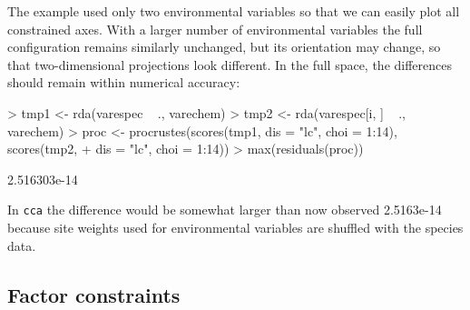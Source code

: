\documentclass[a4paper,10pt]{amsart}
\begin{document}
The example used only two environmental variables so that we can
easily plot all constrained axes.  With a larger number of
environmental variables the full configuration remains similarly
unchanged, but its orientation may change, so that two-dimensional
projections look different.  In the full space, the differences should
remain within numerical accuracy:
\begin{Schunk}
\begin{Sinput}
> tmp1 <- rda(varespec ~ ., varechem)
> tmp2 <- rda(varespec[i, ] ~ ., varechem)
> proc <- procrustes(scores(tmp1, dis = "lc", choi = 1:14), scores(tmp2, 
+     dis = "lc", choi = 1:14))
> max(residuals(proc))
\end{Sinput}
\begin{Soutput}
[1] 2.516303e-14
\end{Soutput}
\end{Schunk}
In \texttt{cca} the difference would be somewhat larger than now
observed 2.5163e-14 because site
weights used for environmental variables are shuffled with the species
data.

\subsection{Factor constraints}
\end{document}
